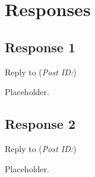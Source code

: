 
\newpage
\chapter{Responses}

  \section{Response 1}
    \begin{mdframed}[backgroundcolor=green!20]
      Reply to \textbf{} (\textit{Post ID:})
    \end{mdframed}
    Placeholder.


  \section{Response 2}
    \begin{mdframed}[backgroundcolor=green!20]
      Reply to \textbf{} (\textit{Post ID:})
    \end{mdframed}
    Placeholder.
